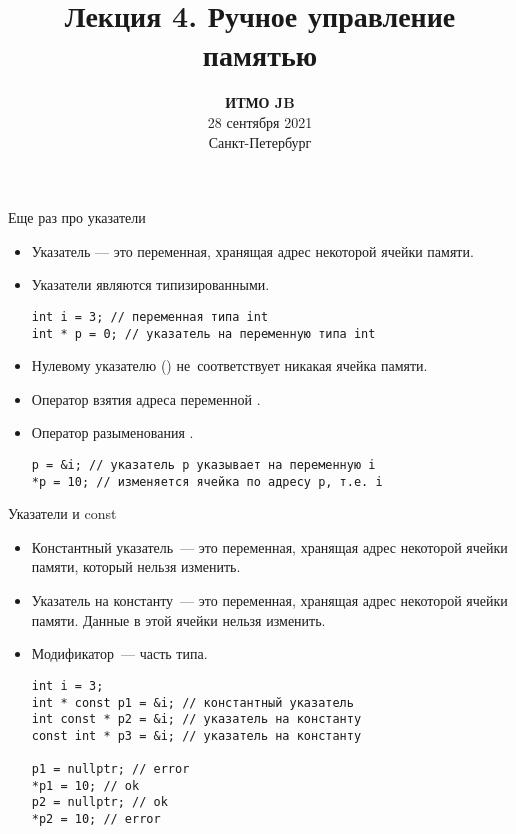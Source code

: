 \documentclass{beamer}
\title{Лекция 4. Ручное управление памятью}
\date{
   \textbf{ИТМО JB}\\
   28 сентября 2021 \\
   Санкт-Петербург
}
\begin{document}
\begin{frame} 
  \titlepage
\end{frame}

\begin{frame}[fragile]{Еще раз про указатели}
    \begin{itemize}
        \item Указатель — это переменная, хранящая адрес некоторой 
            ячейки памяти.
        \item Указатели являются типизированными.
\begin{lstlisting}
int i = 3; // переменная типа int
int * p = 0; // указатель на переменную типа int
\end{lstlisting}
        \item Нулевому указателю () не~соответствует никакая ячейка памяти.
        \item Оператор взятия адреса переменной \code{\&}.
        \item Оператор разыменования \code{*}.

\begin{lstlisting}
p = &i; // указатель p указывает на переменную i
*p = 10; // изменяется ячейка по адресу p, т.е. i
\end{lstlisting}
    \end{itemize}
\end{frame}

\begin{frame}[fragile]{Указатели и const}
    \begin{itemize}
        \item Константный указатель~--- это переменная, хранящая адрес некоторой 
            ячейки памяти, который нельзя изменить.
        \item Указатель на константу~--- это переменная, хранящая адрес некоторой 
            ячейки памяти. Данные в этой ячейки нельзя изменить.
        \item Модификатор~--- часть типа.
\begin{lstlisting}
int i = 3;
int * const p1 = &i; // константный указатель
int const * p2 = &i; // указатель на константу
const int * p3 = &i; // указатель на константу

p1 = nullptr; // error
*p1 = 10; // ok
p2 = nullptr; // ok
*p2 = 10; // error
\end{lstlisting}
    \end{itemize}
\end{frame}
\end{document}
